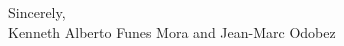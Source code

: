\documentclass[12pt]{article}
\begin{document}


\vspace*{8mm}

\noindent Sincerely,\\[3mm]
%
Kenneth Alberto Funes Mora and Jean-Marc Odobez



\newpage
\end{document}
